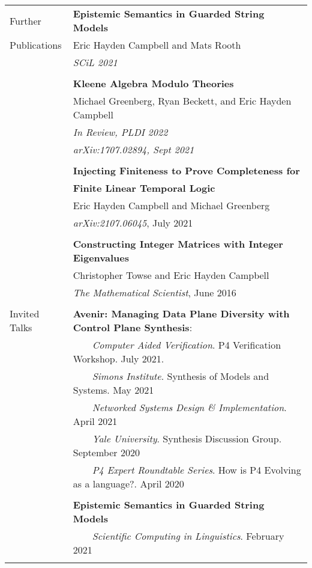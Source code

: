 \documentclass[letterpaper,10pt,oneside]{article}
\newcommand{\tabitem}{~~\llap{\textbullet}~~}
\begin{document}
\begin{tabular}{@{} l l }

  \Large{Further}
  & \textbf{Epistemic Semantics in Guarded String Models}\\
  \Large{Publications}
  & Eric Hayden Campbell and Mats Rooth \\
  & \textit{SCiL 2021} \\
  & \\

  & \textbf{Kleene Algebra Modulo Theories} \\
  & Michael Greenberg, Ryan Beckett, and Eric Hayden Campbell \\
  & \textit{In Review, PLDI 2022} \\
  & \textit{arXiv:1707.02894, Sept 2021} \\
  &\\

  & \textbf{Injecting Finiteness to Prove Completeness for} \\
  & \textbf{Finite Linear Temporal Logic} \\
  & Eric Hayden Campbell and Michael Greenberg \\
  & \textit{arXiv:2107.06045}, July 2021\\
  &\\

  & \textbf{Constructing Integer Matrices with Integer Eigenvalues} \\
  & Christopher Towse and Eric Hayden Campbell \\
  & \textit{The Mathematical Scientist}, June 2016 \\
  & \\

  \Large{Invited Talks}
  & \textbf{Avenir: Managing Data Plane Diversity with Control Plane Synthesis}: \\
      & \tabitem \textit{Computer Aided Verification}. P4 Verification Workshop. July 2021.\\
      & \tabitem \textit{Simons Institute}. Synthesis of Models and Systems. May 2021\\
      & \tabitem \textit{Networked Systems Design \& Implementation}. April 2021\\
      & \tabitem \textit{Yale University}. Synthesis Discussion Group.  September 2020\\
      & \tabitem \textit{P4 Expert Roundtable Series}. How is P4 Evolving as a language?. April 2020\\
  & \\
  & \textbf{Epistemic Semantics in Guarded String Models} \\
  & \tabitem \textit{Scientific Computing in Linguistics}. February 2021\\
  & \\


\end{tabular}
\end{document}
